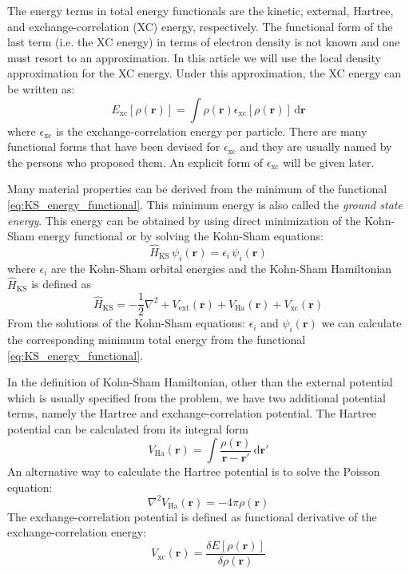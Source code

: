 The energy terms in total energy functionals are the kinetic, external, Hartree, and exchange-correlation
(XC) energy, respectively. The functional form of the last term (i.e. the XC energy)
in terms of electron density is not known and one must resort to an approximation. In this article
we will use the local density approximation for the XC energy. Under this approximation, the XC energy
can be written as:
\begin{equation}
E_{\mathrm{xc}}\left[\rho(\mathbf{r})\right] = 
\int \rho(\mathbf{r}) \epsilon_{\mathrm{xc}}\left[\rho(\mathbf{r})\right]\,\mathrm{d}\mathbf{r}
\end{equation}
where $\epsilon_{\mathrm{xc}}$ is the exchange-correlation energy per particle.
There are many functional forms that have been devised for $\epsilon_{\mathrm{xc}}$
and they are usually named by the persons who proposed them.
An explicit form of $\epsilon_{\mathrm{xc}}$ will be given later.


Many material properties can be derived from the minimum of the
functional \eqref{eq:KS_energy_functional}. This minimum energy is also called the
\textit{ground state energy}. This energy can be obtained by using direct
minimization of the Kohn-Sham energy functional or by solving the Kohn-Sham equations:
\begin{equation}
\hat{H}_{\mathrm{KS}}\,\psi_{i}(\mathbf{r}) = \epsilon_{i}\,\psi_{i}(\mathbf{r})
\label{eq:KS_equations}
\end{equation}
%
where $\epsilon_{i}$ are the Kohn-Sham orbital energies and the
Kohn-Sham Hamiltonian $\hat{H}_{\mathrm{KS}}$ is defined as
%
\begin{equation}
\hat{H}_{\mathrm{KS}} = -\frac{1}{2}\nabla^{2} + V_{\mathrm{ext}}(\mathbf{r}) +
V_{\mathrm{Ha}}(\mathbf{r}) + V_{\mathrm{xc}}(\mathbf{r})
\label{eq:KS_hamiltonian}
\end{equation}
%
From the solutions of the Kohn-Sham equations: ${\epsilon_{i}}$ and ${\psi_{i}(\mathbf{r})}$
we can calculate the corresponding minimum total energy from the functional
\eqref{eq:KS_energy_functional}.

In the definition of Kohn-Sham Hamiltonian, other than the external potential
which is usually specified from the problem,
we have two additional potential terms, namely the Hartree and exchange-correlation
potential.
The Hartree potential can be calculated from its integral form
\begin{equation}
V_{\mathrm{Ha}}(\mathbf{r}) = \int
\frac{\rho(\mathbf{r})}{\mathbf{r} - \mathbf{r}'}\,\mathrm{d}\mathbf{r}'
\end{equation}
An alternative way to calculate the Hartree potential is to solve the Poisson equation:
\begin{equation}
\nabla^2 V_{\mathrm{Ha}}(\mathbf{r}) = -4\pi\rho(\mathbf{r})
\label{eq:poisson_eq}
\end{equation}
%
The exchange-correlation potential is defined as functional derivative of the
exchange-correlation energy:
\begin{equation}
V_{\mathrm{xc}}(\mathbf{r}) = \frac{\delta E[\rho(\mathbf{r})]}{\delta \rho(\mathbf{r})}
\end{equation}

